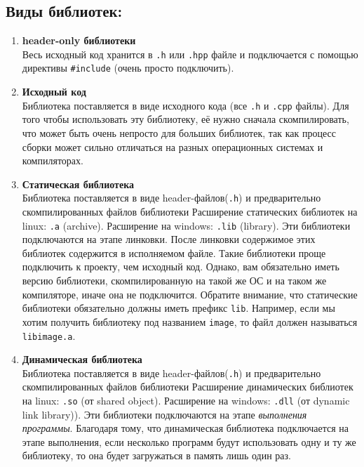 \documentclass{article}
\begin{document}
\subsection*{Виды библиотек:}
\begin{enumerate}
\item \textbf{header-only библиотеки} \\
Весь исходный код хранится в \texttt{.h} или \texttt{.hpp} файле и подключается с помощью директивы \texttt{\#include} (очень просто подключить).

\item \textbf{Исходный код} \\
Библиотека поставляется в виде исходного кода (все \texttt{.h} и \texttt{.cpp} файлы). Для того чтобы использовать эту библиотеку, её нужно сначала скомпилировать, что может быть очень непросто для больших библиотек, так как процесс сборки может сильно отличаться на разных операционных системах и компиляторах.

\item \textbf{Статическая библиотека} \\
Библиотека поставляется в виде header-файлов(\texttt{.h}) и предварительно скомпилированных файлов библиотеки Расширение статических библиотек на linux: \texttt{.a} (archive). Расширение на windows: \texttt{.lib} (library). Эти библиотеки подключаются на этапе линковки. После линковки содержимое этих библиотек содержится в исполняемом файле. Такие библиотеки проще подключить к проекту, чем исходный код. Однако, вам обязательно иметь версию библиотеки, скомпилированную на такой же ОС и на таком же компиляторе, иначе она не подключится. Обратите внимание, что статические библиотеки обязательно должны иметь префикс \texttt{lib}. Например, если мы хотим получить библиотеку под названием \texttt{image}, то файл должен называться \texttt{libimage.a}.

\item \textbf{Динамическая библиотека} \\
Библиотека поставляется в виде header-файлов(\texttt{.h}) и предварительно скомпилированных файлов библиотеки Расширение динамических библиотек на linux: \texttt{.so} (от shared object). Расширение на windows: \texttt{.dll} (от dynamic link library)). Эти библиотеки подключаются на этапе \textit{выполнения программы}. Благодаря тому, что динамическая библиотека подключается на этапе выполнения, если несколько программ будут использовать одну и ту же библиотеку, то она будет загружаться в память лишь один раз.
\end{enumerate}
\end{document}
